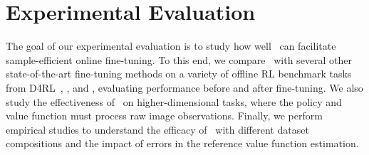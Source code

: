 \vspace{-0.09cm}
\section{Experimental Evaluation}
\vspace{-0.22cm}
\label{sec:experiments}
The goal of our experimental evaluation is to study how well \methodname\ can facilitate sample-efficient online fine-tuning. To this end, we compare \methodname\ with several other state-of-the-art fine-tuning methods on a variety of offline RL benchmark tasks from D4RL~\cite{fu2020d4rl}, \citet{singh2020cog}, and \citet{nair2020accelerating}, evaluating performance before and after fine-tuning. We also study the effectiveness of \methodname\ on higher-dimensional tasks, where the policy and value function must process raw image observations. Finally, we perform empirical studies to understand the efficacy of \methodname\ with different dataset compositions and the impact of errors in the reference value function estimation.

~

